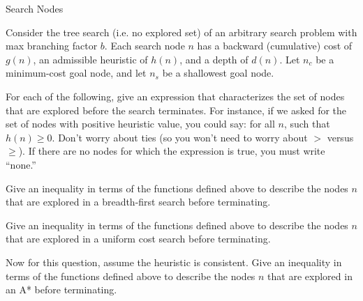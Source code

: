 \begin{problem}{Search Nodes}

Consider the tree search (i.e. no explored set) of an arbitrary search problem with max branching factor $b$. Each search node $n$ has a backward (cumulative) cost of $g(n)$, an admissible heuristic of $h(n)$, and a depth of $d(n)$. Let $n_c$ be a minimum-cost goal node, and let $n_s$ be a shallowest goal node.

For each of the following, give an expression that characterizes the set of nodes that are explored before the search terminates.
For instance, if we asked for the set of nodes with positive heuristic value, you could say: for all $n$, such that $h(n) \geq 0$. Don't worry about ties (so you won’t need to worry about $>$ versus $\geq$). If there are no nodes for which the expression is true, you must write ``none.''

\begin{question}[5]
Give an inequality in terms of the functions defined above to describe the nodes $n$ that are explored in a breadth-first search before terminating.

  
\end{question}

\begin{question}[5]
Give an inequality in terms of the functions defined above to describe the nodes $n$ that are explored in a uniform cost search before terminating.

  
\end{question}

\begin{question}[5]
Now for this question, assume the heuristic is consistent. Give an inequality in terms of the functions defined above to describe the nodes $n$ that are explored in an A* before terminating.

  
\end{question}


\end{problem}